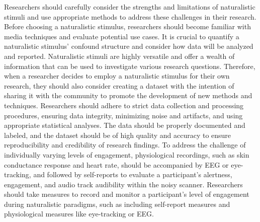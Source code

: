 Researchers should carefully consider the strengths and limitations of
naturalistic stimuli and use appropriate methods to address these challenges in
their research.
%
Before choosing a naturalistic stimulus, researchers should become familiar with
media techniques and evaluate potential use cases.
%
It is crucial to quantify a naturalistic stimulus' confound structure and
consider how data will be analyzed and reported. Naturalistic stimuli are highly
versatile and offer a wealth of information that can be used to investigate
various research questions.
Therefore, when a researcher decides to employ a naturalistic stimulus for their
own research, they should also consider creating a dataset with the intention of
sharing it with the community to promote the development of new methods and
techniques.
%
Researchers should adhere to strict data collection and processing procedures,
ensuring data integrity, minimizing noise and artifacts, and using appropriate
statistical analyses.
%
The data should be properly documented and labeled, and the dataset should be of
high quality and accuracy to ensure reproducibility and credibility of research
findings.
%
To address the challenge of individually varying levels of engagement,
physiological recordings, such as skin conductance response and heart rate,
should be accompanied by EEG or eye-tracking, and followed by self-reports to
evaluate a participant's alertness, engagement, and audio track audibility
within the noisy scanner.
%
Researchers should take measures to record and monitor a participant's level of
engagement during naturalistic paradigms, such as including self-report measures
and physiological measures like eye-tracking or EEG.


